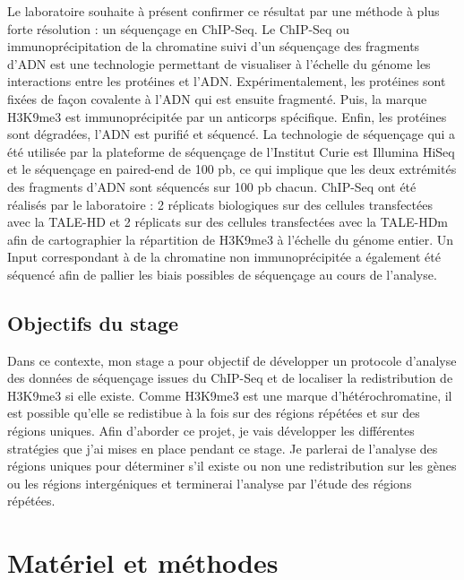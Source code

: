 \documentclass[a4paper,12pt,times]{report}
\begin{document}
\newpage
Le laboratoire souhaite à présent confirmer ce résultat par une méthode à plus forte résolution : un séquençage en ChIP-Seq.
Le ChIP-Seq ou immunoprécipitation de la chromatine suivi d'un séquençage des fragments d'ADN est une technologie permettant de visualiser à l'échelle du génome les interactions entre les protéines et l'ADN. Expérimentalement, les protéines sont fixées de façon covalente à l'ADN qui est ensuite fragmenté. Puis, la marque H3K9me3 est immunoprécipitée par un anticorps spécifique. Enfin, les protéines sont dégradées, l'ADN est purifié et séquencé.
La technologie de séquençage qui a été utilisée par la plateforme de séquençage de l'Institut Curie est Illumina HiSeq \cite{pmid19997069} et 
le séquençage en paired-end de 100 pb, ce qui implique que les deux extrémités des fragments d'ADN sont séquencés  sur 100 pb chacun.
 ChIP-Seq ont été réalisés par le laboratoire : 2 réplicats biologiques sur des cellules transfectées avec la TALE-HD  et 2 réplicats sur des cellules transfectées avec la TALE-HDm afin de cartographier la répartition de H3K9me3 à l'échelle du génome entier.
Un Input correspondant à de la chromatine non immunoprécipitée a également été séquencé afin de pallier les biais possibles de séquençage au cours de l'analyse.
\section{Objectifs du stage}
\bigskip
Dans ce contexte, mon stage a pour objectif de développer un protocole d'analyse des données de séquençage issues du ChIP-Seq et de localiser la redistribution de H3K9me3 si elle existe.
\newline
Comme H3K9me3 est une marque d'hétérochromatine, il est possible qu'elle se redistibue à la fois sur des régions répétées et sur des régions uniques. 
\newline Afin d'aborder ce projet, je vais développer les différentes stratégies que j'ai mises en place pendant ce stage. Je parlerai de l'analyse des régions uniques pour déterminer s'il existe ou non une redistribution sur les gènes ou les régions intergéniques et terminerai l'analyse par l'étude des régions répétées.



\chapter*{{
\vspace*{-2cm}}Matériel et méthodes}
\end{document}
